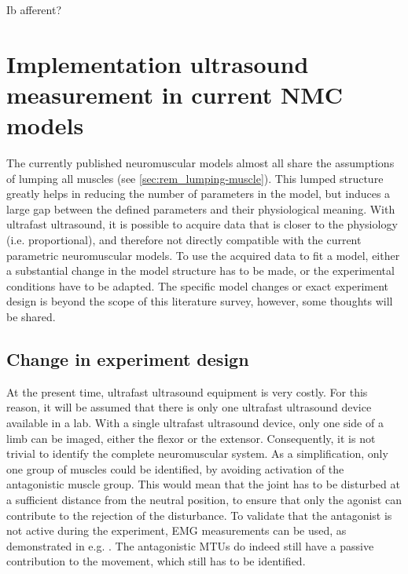 Ib afferent? 











\section{Implementation ultrasound measurement in current NMC models}
\label{sec:rem_incompatibility}
The currently published neuromuscular models almost all share the assumptions of lumping all muscles (see \autoref{sec:rem_lumping-muscle}). This lumped structure greatly helps in reducing the number of parameters in the model, but induces a large gap between the defined parameters and their physiological meaning. With ultrafast ultrasound, it is possible to acquire data that is closer to the physiology (i.e. proportional), and therefore not directly compatible with the current parametric neuromuscular models. To use the acquired data to fit a model, either a substantial change in the model structure has to be made, or the experimental conditions have to be adapted. The specific model changes or exact experiment design is beyond the scope of this literature survey, however, some thoughts will be shared.




\subsection{Change in experiment design}
At the present time, ultrafast ultrasound equipment is very costly. For this reason, it will be assumed that there is only one ultrafast ultrasound device available in a lab. With a single ultrafast ultrasound device, only one side of a limb can be imaged, either the flexor or the extensor. Consequently, it is not trivial to identify the complete neuromuscular system. As a simplification, only one group of muscles could be identified, by avoiding activation of the antagonistic muscle group. This would mean that the joint has to be disturbed at a sufficient distance from the neutral position, to ensure that only the agonist can contribute to the rejection of the disturbance. To validate that the antagonist is not active during the experiment, EMG measurements can be used, as demonstrated in e.g. \cite{kearney_identification_1997, mirbagheri_intrinsic_2000}. The antagonistic MTUs do indeed still have a passive contribution to the movement, which still has to be identified. 

